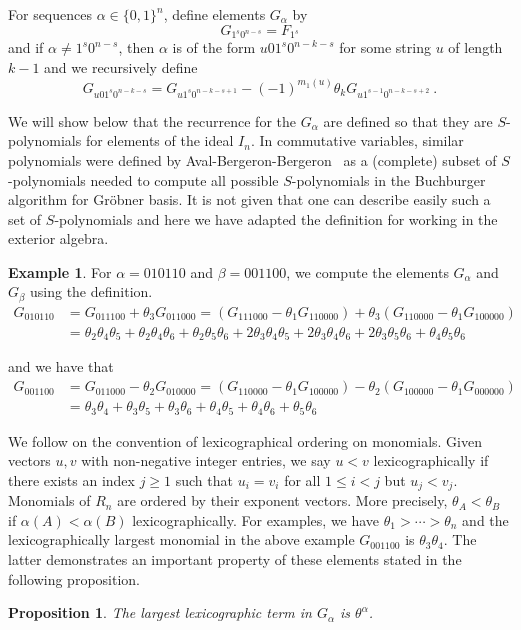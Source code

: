 \documentclass[11pt]{amsart}
\newtheorem{prop}[theorem]{Proposition}
\theoremstyle{definition}
\newtheorem{example}[theorem]{Example}
\numberwithin{equation}{section}
\begin{document}
For sequences $\alpha \in \{ 0, 1 \}^n$, define elements $G_\alpha$ by
\begin{equation}\label{eq:Gdef1}
G_{1^s0^{n-s}} = F_{1^s}
\end{equation}
and if $\alpha \neq 1^s 0^{n-s}$, then $\alpha$ is of the form $u01^s0^{n-k-s}$ for some string $u$
of length $k-1$ and we recursively define
\begin{equation}\label{eq:Gdef2}
G_{u01^s0^{n-k-s}} = G_{u1^s0^{n-k-s+1}} - (-1)^{m_1(u)} \theta_k G_{u1^{s-1}0^{n-k-s+2}}~.
\end{equation}

We will show below that the recurrence for the
$G_\alpha$ are defined so that they are $S$-polynomials \cite{CLO}
for elements of the ideal $I_n$.
In commutative variables, similar polynomials were defined by Aval-Bergeron-Bergeron~\cite{AB,ABB}
as a (complete) subset of $S$-polynomials needed to compute all possible
$S$-polynomials in the Buchburger algorithm for Gr\"obner basis.
It is not given that one can describe easily such a set of $S$-polynomials and here we have adapted
the definition for working in the exterior algebra.

\begin{example} For $\alpha = 010110$ and $\beta = 001100$, we compute
the elements $G_\alpha$ and $G_\beta$ using the definition.
\begin{align*}
G_{010110} &= G_{011100} + \theta_3 G_{011000} = (G_{111000} - \theta_1 G_{110000})
+ \theta_3(G_{110000} - \theta_1 G_{100000})\\
&= \theta_2 \theta_4 \theta_5 + \theta_2 \theta_4 \theta_6 + \theta_2 \theta_5 \theta_6
+ 2 \theta_3 \theta_4 \theta_5 + 2 \theta_3 \theta_4 \theta_6 + 2 \theta_3 \theta_5 \theta_6
+ \theta_4 \theta_5 \theta_6
\end{align*}

and we have that
\begin{align*}
G_{001100} &= G_{011000} - \theta_2 G_{010000} = (G_{110000} - \theta_1 G_{100000})
- \theta_2 (G_{100000} - \theta_1 G_{000000})\\
&= \theta_3 \theta_4 + \theta_3 \theta_5 + \theta_3 \theta_6 + \theta_4 \theta_5 + \theta_4 \theta_6 + \theta_5 \theta_6
\end{align*}
\end{example}

We follow \cite{CLO} on the convention of lexicographical ordering on monomials.
Given vectors $u,v$ with non-negative integer entries, we say $u < v$ lexicographically if
there exists an index $j \ge 1$ such that $u_{i} = v_{i}$ for all $1 \le i < j$ but
$u_{j} < v_{j}$.  Monomials of $R_{n}$ are ordered by their exponent vectors.  More
precisely, $\theta_{A} < \theta_{B}$ if $\alpha(A) < \alpha(B)$ lexicographically.  For examples, we have
$\theta_{1} > \cdots > \theta_{n}$ and the lexicographically largest monomial in the above example
$G_{001100}$ is $\theta_{3}\theta_{4}$.  The latter demonstrates an important property of these
elements stated in the following proposition.  
\begin{prop}\label{prop:largest}
The largest lexicographic term in $G_\alpha$ is $\theta^\alpha$.
\end{prop}
\end{document}
